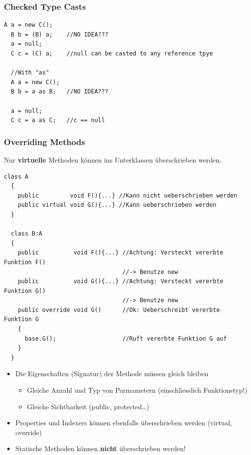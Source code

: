 \subsubsection{Checked Type Casts}
\begin{lstlisting}[style=Csharp]
  A a = new C(); 
  B b = (B) a;    //NO IDEA???
  a = null; 
  C c = (C) a;    //null can be casted to any reference tpye
  
  //With "as"
  A a = new C();  
  B b = a as B;   //NO IDEA???
  
  a = null; 
  C c = a as C;   //c == null
\end{lstlisting}

\subsubsection{Overriding Methods}
Nur \textbf{virtuelle} Methoden können ins Unterklassen überschrieben werden. 
\begin{lstlisting}[style=Csharp]
  class A
  {
    public         void F(){...} //Kann nicht ueberschrieben werden 
    public virtual void G(){...} //Kann ueberschrieben werden
  }
  
  class B:A
  {
    public          void F(){...} //Achtung: Versteckt vererbte Funktion F()
                                  //-> Benutze new
    public          void G(){...} //Achtung: Versteckt vererbte Funktion G()
                                  //-> Benutze new
    public override void G()      //Ok: Ueberschreibt vererbte Funktion G
    {
      base.G();                   //Ruft vererbte Funktion G auf
    }
  }
\end{lstlisting}
\begin{itemize}
  \item Die Eigenschaften (Signatur) der Methode müssen gleich bleiben 
  \begin {itemize}
    \item Gleiche Anzahl und Typ von Parmametern (einschliesslich Funktionstyp!)
    \item Gleiche Sichtbarkeit (public, protected\ldots)
  \end{itemize}
  \item Properties und Indexers können ebenfalls überschrieben werden (virtual,
  override)
  \item Statische Methoden können \textbf{nicht} überschrieben werden!
\end{itemize}

